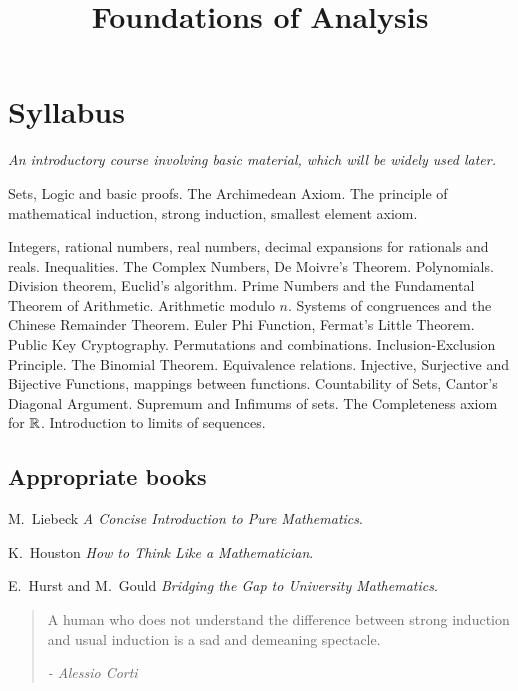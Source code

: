 \documentclass[twoside]{scrartcl}
\title{Foundations of Analysis}
\begin{document}
{
\section*{Syllabus}
\textit{An introductory course involving basic material, which will be widely used later.}

 Sets, Logic and basic proofs. The Archimedean Axiom. The principle of mathematical induction, strong induction, smallest element axiom. \vspace*{5pt}

 Integers, rational numbers, real numbers, decimal expansions for rationals and
reals. Inequalities. The Complex Numbers, De Moivre's Theorem. Polynomials. \vspace*{5pt}
 Division theorem, Euclid’s algorithm. Prime Numbers and the Fundamental Theorem of Arithmetic. Arithmetic modulo $n$. Systems of congruences and the Chinese Remainder Theorem. Euler Phi Function, Fermat's Little Theorem. Public Key Cryptography. \vspace*{5pt}
 Permutations and combinations. Inclusion-Exclusion Principle. The Binomial Theorem. Equivalence relations.  \vspace*{5pt}
 Injective, Surjective and Bijective Functions, mappings between functions. Countability of Sets, Cantor's Diagonal Argument. \vspace*{5pt}
 Supremum and Infimums of sets. The Completeness axiom for $\mathbb{R}$.  Introduction to limits of sequences.

\subsection*{Appropriate books}

{\shortskip
M.~Liebeck \emph{A Concise Introduction to Pure Mathematics}.

K.~Houston \emph{How to Think Like a Mathematician}. 

E.~Hurst and M.~Gould \emph{Bridging the Gap to University Mathematics}. 
}}

\TableofContents




\begin{quote}
 A human who does not understand the difference between strong induction and usual induction is a sad and demeaning spectacle. 
\begin{flushright}
      \textit{ -  Alessio Corti}
       \end{flushright} 
\end{quote} 
\end{document}
